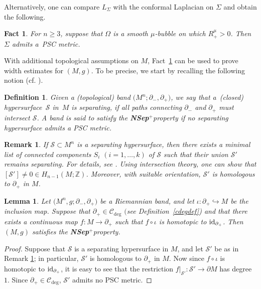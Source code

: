 \documentclass[10pt,a4paper]{amsart}
\numberwithin{equation}{section}
\newtheorem{Lemma}[Theorem]{Lemma}
\newtheorem{Fact}[Theorem]{Fact}
\newtheorem{Definition}[Theorem]{Definition}
\newtheorem{Remark}[Theorem]{Remark} }
\def\Z{\mathbb{Z}}
\def\Scal{\mathcal{S}}
\def\id{{\rm id}}
\def\Nsep{\textbf{\textup{NSep}$^+$}}
\begin{document}
Alternatively, one can compare $L_\Sigma$ with the conformal Laplacian on $\Sigma$ and obtain the following.
\begin{Fact}\label{confPSC}
	For $n\ge 3$, suppose that $\Omega$ is a smooth $\mu$-bubble on which
	$R^\mu_+ >0$. Then $\Sigma$ admits a~PSC metric.
\end{Fact}

With additional topological assumptions on $M$, Fact~\ref{confPSC} can be used
to prove width estimates for $(M,g)$. To be precise, we start by recalling the following notion (cf. \cite[Property~A]{CRZ2022}).
\begin{Definition}\label{noSepDef}
	Given a (topological) band $\big(M^n;\partial_-, \partial_+\big)$, we say that
	a~(closed) hypersurface~$\Scal$ in~$M$ is
	\emph{separating}, if all paths connecting
	$\partial_-$ and $\partial_+$ must intersect $\Scal$.
	A band is said to satisfy
	the \emph{\Nsep property} if no separating hypersurface admits a PSC metric.
\end{Definition}

\begin{Remark}\label{sepRmk}
	If $\Scal\subset M^n$ is a separating hypersurface, then there exists a
	minimal list of connected components $S_i$ $(i = 1,\ldots, k)$ of $\Scal$
	such that their union $\Scal'$ remains separating.
	For details, see \cite[Lemma 2.2]{CRZ2022}.
	Using intersection theory,
	one can show that
	$[\Scal']\ne 0\in H_{n-1}(M;\Z)$. Moreover, with suitable orientation, $\Scal'$ is homologous to $\partial_{+}$ in $M$.
\end{Remark}

\begin{Lemma}\label{C_degNSepLemma}
	Let $\big(M^n, g; \partial_-, \partial_+\big)$ be a
	Riemannian band, and let $\iota\colon \partial_+\hookrightarrow M$ be the inclusion map.
Suppose that $\partial_+ \in \mathcal{C}_{\deg}$ $($see Definition~{\rm \ref{cdegdef})} and that there exists a continuous map ${f\colon M\rightarrow \partial_+}$ such that $f\circ\iota$ is homotopic to  $\id_{\partial_+}$. Then
$(M,g)$ satisfies the \Nsep property.
\end{Lemma}
\begin{proof}Suppose that $\Scal$ is a separating hypersurface in $M$,  and  let $\Scal'$ be as in Remark \ref{sepRmk}; in particular,
 $\Scal'$  is homologous to $\partial_+$ in $M$. Now since $f\circ\iota$ is homotopic to $\id_{\partial_+}$,  it is easy to see that the restriction $f|_{\Scal'}\colon \Scal'\rightarrow \partial M$ has degree $1$. Since $\partial_+\in \mathcal{C}_{\deg}$, $\Scal'$ admits no PSC metric.
\end{proof}
\end{document}
